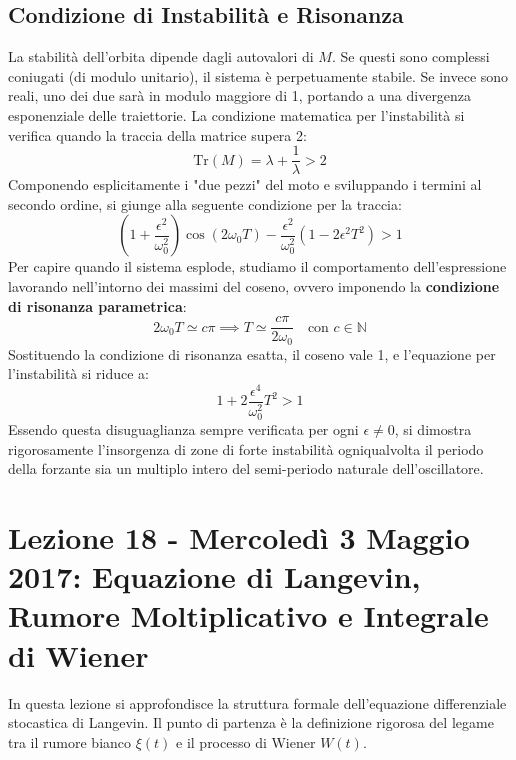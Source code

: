 \documentclass[12pt,a4paper]{article}
\begin{document}
\subsection{Condizione di Instabilità e Risonanza}
La stabilità dell'orbita dipende dagli autovalori di $M$. Se questi sono complessi coniugati (di modulo unitario), il sistema è perpetuamente stabile. Se invece sono reali, uno dei due sarà in modulo maggiore di 1, portando a una divergenza esponenziale delle traiettorie. 
La condizione matematica per l'instabilità si verifica quando la traccia della matrice supera 2:
\begin{equation}
\text{Tr}(M) = \lambda + \frac{1}{\lambda} > 2
\end{equation}
Componendo esplicitamente i "due pezzi" del moto e sviluppando i termini al secondo ordine, si giunge alla seguente condizione per la traccia:
\begin{equation}
\left(1 + \frac{\epsilon^2}{\omega_0^2}\right) \cos(2\omega_0 T) - \frac{\epsilon^2}{\omega_0^2} \left(1 - 2\epsilon^2 T^2\right) > 1
\end{equation}
Per capire quando il sistema esplode, studiamo il comportamento dell'espressione lavorando nell'intorno dei massimi del coseno, ovvero imponendo la \textbf{condizione di risonanza parametrica}:
\begin{equation}
2\omega_0 T \simeq c\pi \implies T \simeq \frac{c\pi}{2\omega_0} \quad \text{con } c \in \mathbb{N}
\end{equation}
Sostituendo la condizione di risonanza esatta, il coseno vale 1, e l'equazione per l'instabilità si riduce a:
\begin{equation}
1 + 2\frac{\epsilon^4}{\omega_0^2} T^2 > 1
\end{equation}
Essendo questa disuguaglianza sempre verificata per ogni $\epsilon \neq 0$, si dimostra rigorosamente l'insorgenza di zone di forte instabilità ogniqualvolta il periodo della forzante sia un multiplo intero del semi-periodo naturale dell'oscillatore.

\newpage
\section{Lezione 18 - Mercoledì 3 Maggio 2017: Equazione di Langevin, Rumore Moltiplicativo e Integrale di Wiener}

In questa lezione si approfondisce la struttura formale dell'equazione differenziale stocastica di Langevin. Il punto di partenza è la definizione rigorosa del legame tra il rumore bianco $\xi(t)$ e il processo di Wiener $W(t)$.
\end{document}
